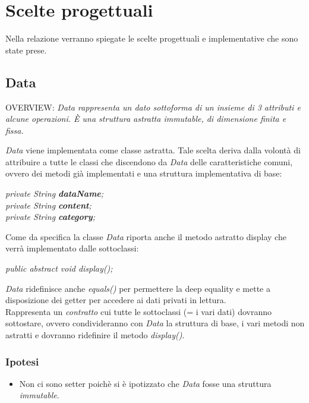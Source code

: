 \documentclass[10pt, a4paper]{article}
\begin{document}
\clearpage

\section{Scelte progettuali}
Nella relazione verranno spiegate le scelte progettuali e implementative che sono state prese.

\subsection{Data}
\begin{center}
OVERVIEW: \textit{Data rappresenta un dato sottoforma di un insieme di 3 attributi e alcune operazioni. È una struttura astratta immutable, di dimensione finita e fissa.}
\end{center}
\textit{Data} viene implementata come classe astratta.
Tale scelta deriva dalla volontà di attribuire a tutte le classi che discendono da \textit{Data} delle caratteristiche comuni, ovvero dei metodi già implementati e una struttura implementativa di base:
\begin{center}
	\textit{private String \textbf{dataName};\\
	private String \textbf{content};\\
	private String \textbf{category};\\}
\end{center}
Come da specifica la classe \textit{Data} riporta anche il metodo astratto display che verrà implementato dalle sottoclassi:
\begin{center}
	\textit{public abstract void display();}
\end{center}
\textit{Data} ridefinisce anche \textit{equals()} per permettere la deep equality e mette a disposizione dei getter per accedere ai dati privati in lettura.\\
Rappresenta un \textit{contratto} cui tutte le sottoclassi (= i vari dati) dovranno sottostare, ovvero condivideranno con \textit{Data} la struttura di base, i vari metodi non astratti e dovranno ridefinire il metodo \textit{display()}.
\subsubsection{Ipotesi}
\begin{itemize}
 \item Non ci sono setter poichè si è ipotizzato che \textit{Data} fosse una struttura \textit{immutable}.
 \end{itemize}
 
\end{document}
